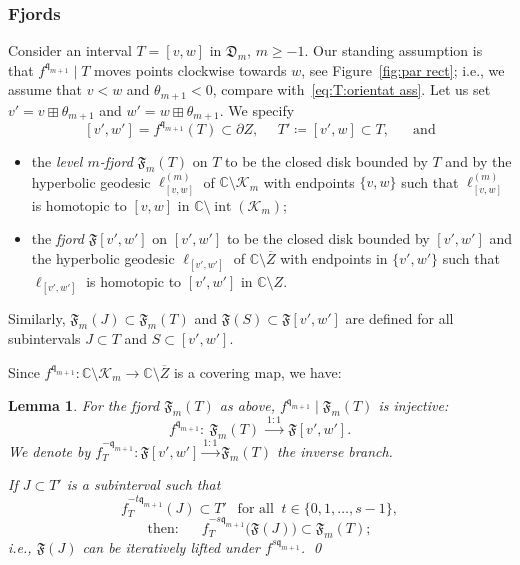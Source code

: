 \documentclass{amsart}
\renewcommand{\sp}{{\ \ }}
\newcommand{\1}{{\mathbb 1 }}
\newcommand\intr{\operatorname{int}}
\newcommand{\qq}{\mathfrak{q}}
\newcommand{\C}{\mathbb{C}}
\newcommand{\Dbb}{{\mathfrak{D}}}
\newtheorem{lem}[thm]{Lemma}
\theoremstyle{remark}
\numberwithin{equation}{section}
\theoremstyle{definition}
\newcommand{\filled}{{\mathcal {K} }}
\newcommand{\Fjord}{{\mathfrak F}}
\begin{document}
\subsubsection{Fjords}
\label{sss:fjords}



Consider an interval $T=[v,w]$ in $\Dbb_m$, $m\ge -1$. Our standing assumption is that $f^{\qq_{m+1}}\mid T$ moves points clockwise towards $w$, see Figure~\ref{fig:par rect}; i.e., we assume that $ v<w$ and $\theta_{m+1} <0$, compare with~\eqref{eq:T:orientat ass}. Let us set $v'=v\boxplus \theta_{m+1}$ and $w'=w\boxplus \theta_{m+1}$. We specify 
\[[v',w'] = f^{\qq_{m+1}}(T)\subset \partial Z ,\sp \sp\sp T'\coloneqq[v',w]\subset T,\sp \sp\sp\text{ and}\]
\begin{itemize}
\item the \emph{level $m$-fjord} $\Fjord_m(T)$ on $T$ to be the closed disk bounded by $T$ and by the hyperbolic geodesic $\ell_{[v,w]}^{(m)}$ of $\C\setminus \filled_m$ with endpoints $\{v,w\}$ such that $\ell_{[v,w]}^{(m)}$ is homotopic to $[v,w]$ in $\C\setminus \intr(\filled_{m})$;
 \item the \emph{fjord} $\Fjord[v',w']$ on $[v',w']$ to be the closed disk bounded by $[v',w']$ and the hyperbolic geodesic $\ell_{[v',w']}$ of $\C\setminus \overline Z$ with endpoints in $\{v',w'\}$ such that $\ell_{[v',w']}$ is homotopic to $[v',w']$ in $\C\setminus Z$.
\end{itemize}

Similarly, $\Fjord_m(J)\subset \Fjord_m(T)$ and $\Fjord(S)\subset \Fjord[v',w']$ are defined for all subintervals $J\subset T$ and $S\subset [v',w']$. 

Since $f^{\qq_{m+1}}\colon \C\setminus \filled_m\to \C\setminus \overline Z$ is a covering map, we have:

\begin{lem}
\label{lem:Fjord_m(T)}
For the fjord $\Fjord_m(T)$ as above, $f^{\qq_{m+1}}\mid \Fjord_m(T)$ is injective:
\[ f^{\qq_{m+1}}\colon\ \Fjord_m(T)\ \overset{1:1}{\longrightarrow} \ \Fjord[v',w']. \]
We denote by $f^{-\qq_{m+1}}_T\colon \Fjord[v',w'] \overset{1:1}{\longrightarrow} \Fjord_m(T)$ the inverse branch.

  If $J\subset T'$ is a subinterval such that \[ f^{-t\qq_{m+1}}_T(J)\subset T'\sp\text{ for all }\ t\in \{ 0,1,\dots, s-1\},\] 
\[\text{then: }\sp\sp \sp  f_T^{ -s\qq_{m+1}}\big(\Fjord(J)\big)\subset\Fjord_m(T);\]
i.e., $\Fjord(J)$ can be iteratively lifted under $f^{ s\qq_{m+1}}$. 
\qed
\end{lem}  
\end{document}
